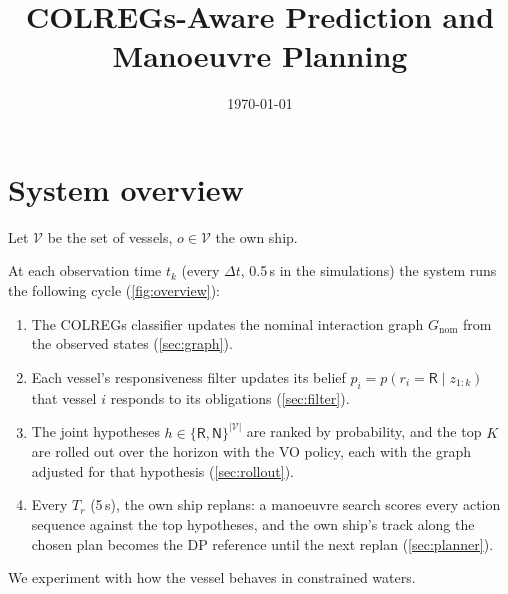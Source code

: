 \documentclass[10pt,a4paper]{article}
\title{COLREGs-Aware Prediction and Manoeuvre Planning\\[0.3em]}
\date{\today}
\newcommand{\R}{\mathsf{R}}
\newcommand{\N}{\mathsf{N}}
\begin{document}
\maketitle

\section{System overview}\label{sec:overview}

Let $\mathcal{V}$ be the set of vessels, $o\in\mathcal{V}$ the own ship.

At each observation time $t_k$ (every $\Delta t$, 0.5\,s in the simulations) the
system runs the following cycle (\cref{fig:overview}): \begin{enumerate} \item
The COLREGs classifier updates the nominal interaction graph $G_{\text{nom}}$
from the observed states (\cref{sec:graph}).  \item Each vessel's responsiveness
filter updates its belief $p_i = p(r_i = \R \mid z_{1:k})$ that vessel $i$
responds to its obligations (\cref{sec:filter}).  \item The joint hypotheses $h
\in \{\R,\N\}^{|\mathcal{V}|}$ are ranked by probability, and the top $K$ are
rolled out over the horizon with the VO policy, each with the graph adjusted for
that hypothesis (\cref{sec:rollout}).  \item Every $T_r$ (5\,s), the own ship
replans: a manoeuvre search scores every action sequence against the top
hypotheses, and the own ship's track along the chosen plan becomes the DP
reference until the next replan (\cref{sec:planner}).  \end{enumerate}

We experiment with how the vessel behaves in constrained waters.
\end{document}
